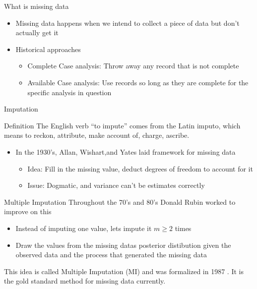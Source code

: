 \begin{frame}{What is missing data}
 \begin{itemize}
 \item Missing data happens when we intend to collect a piece of data but don't actually get it
 \item Historical approaches
 \begin{itemize}
  \item Complete Case analysis: Throw away any record that is not complete
 \item Available Case analysis: Use records so long as they are complete for the specific analysis in question
 \end{itemize}
 \end{itemize}
\end{frame}


\begin{frame}{Imputation}
\begin{block}{Definition}
The English verb ``to impute'' comes from the Latin imputo, which means
to reckon, attribute, make account of, charge, ascribe. \cite{VanBuuren2012}
\end{block}
\begin{itemize}
 \item In the 1930's, Allan, Wishart,and Yates laid framework for missing data
 \begin{itemize}
  \item Idea: Fill in the missing value, deduct degrees of freedom to account for it
  \item Issue: Dogmatic, and variance can't be estimates correctly
 \end{itemize}

\end{itemize}

 
\end{frame}

\begin{frame}{Multiple Imputation}
Throughout the 70's and 80's Donald Rubin worked to improve on this
\begin{itemize}
 \item Instead of imputing one value, lets impute it $m\geq 2$ times
 \item Draw the values from the missing datas posterior distibution given the observed
 data and the process that generated the missing data
\end{itemize}
This idea is called Multiple Imputation (MI) and was formalized in 1987 \cite{Rubin1987}. It is the gold standard method
for missing data currently.
\end{frame}



